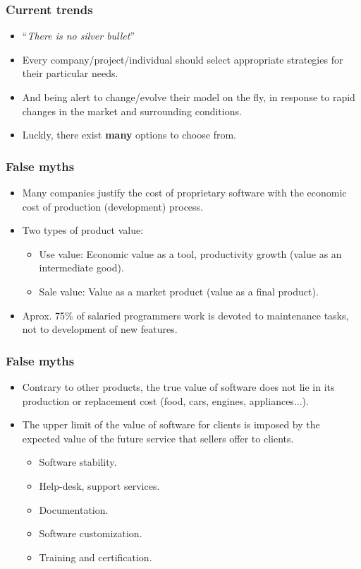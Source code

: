 \begin{frame}
 \frametitle{Current trends}
 \begin{itemize}
 \item ``\textit{There is no silver bullet}''
 \item Every company/project/individual should select appropriate strategies for their particular needs.
 \item And being alert to change/evolve their model on the fly, in response to rapid changes in the market
and surrounding conditions.
 \item Luckly, there exist \textbf{many} options to choose from.
 \end{itemize}
\end{frame}

\begin{frame}
 \frametitle{False myths}
\begin{itemize}
 \item Many companies justify the cost of proprietary software with the economic cost of production (development) process.
\item Two types of product value:
    \begin{itemize}
     \item \alert{Use} value: Economic value as a tool, productivity growth (value as an intermediate good).
     \item \alert{Sale} value: Value as a market product (value as a final product).
    \end{itemize}
\item Aprox. 75\% of salaried programmers work is devoted to
\alert{maintenance} tasks, not to \alert{development} of new features.
\end{itemize}

\end{frame}

\begin{frame}
 \frametitle{False myths}
\begin{itemize}
 \item Contrary to other products, the true \alert{value} of software does not lie in its production
or replacement cost (food, cars, engines, appliances...).
 \item The upper limit of the value of software for clients is imposed by the expected value of the future service
that sellers offer to clients.
      \begin{itemize}
       \item Software stability.
       \item Help-desk, support services.
       \item Documentation.
       \item Software customization.
       \item Training and certification.
      \end{itemize}
  \pause
\end{itemize}

\end{frame}

